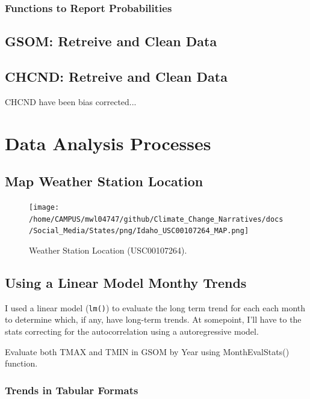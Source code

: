 \documentclass{article}\usepackage[]{graphicx}\usepackage[]{color}
\begin{document}
\subsubsection{Functions to Report Probabilities}




\subsection{GSOM: Retreive and Clean Data}



\subsection{CHCND: Retreive and Clean Data}

CHCND have been bias corrected...


\section{Data Analysis Processes}

\subsection{Map Weather Station Location}






\begin{figure}
\texttt{[image: /home/CAMPUS/mwl04747/github/Climate\_Change\_Narratives/docs/Social\_Media/States/png/Idaho\_USC00107264\_MAP.png]}
\caption{Weather Station Location (USC00107264). }
\label{fig:Map}
\end{figure}

\subsection{Using a Linear Model Monthy Trends}

I used a linear model (\texttt{lm()}) to evaluate the long term trend for each each month to determine which, if any, have long-term trends. At somepoint, I'll have to the stats correcting for the autocorrelation using a autoregressive model.  



Evaluate both TMAX and TMIN in GSOM by Year using MonthEvalStats() function. 




\subsubsection{Trends in Tabular Formats}
\end{document}
